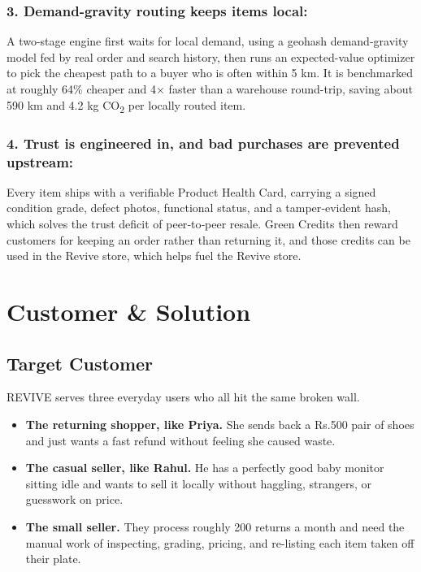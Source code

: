 \documentclass[11pt]{article}
\newcommand{\placeholder}[1]{{\color{placeGray} #1}}
\begin{document}
\subsubsection*{\color{amznSlate} 3. Demand-gravity routing keeps items local:}
\placeholder{A two-stage engine first waits for local demand, using a geohash demand-gravity model fed by real order and search history, then runs an expected-value optimizer to pick the cheapest path to a buyer who is often within 5 km. It is benchmarked at roughly 64\% cheaper and 4$\times$ faster than a warehouse round-trip, saving about 590 km and 4.2 kg CO\textsubscript{2} per locally routed item.}

\subsubsection*{\color{amznSlate} 4. Trust is engineered in, and bad purchases are prevented upstream:}
\placeholder{Every item ships with a verifiable Product Health Card, carrying a signed condition grade, defect photos, functional status, and a tamper‑evident hash, which solves the trust deficit of peer‑to‑peer resale. Green Credits then reward customers for keeping an order rather than returning it, and those credits can be used in the Revive store, which helps fuel the Revive store.}

\section{Customer \& Solution}

\subsection{Target Customer}

\placeholder{REVIVE serves three everyday users who all hit the same broken wall.}

\begin{itemize}[leftmargin=2em,itemsep=6pt,topsep=4pt]
  \item \textbf{The returning shopper, like Priya.} \placeholder{She sends back a Rs.500 pair of shoes and just wants a fast refund without feeling she caused waste.}
  \item \textbf{The casual seller, like Rahul.} \placeholder{He has a perfectly good baby monitor sitting idle and wants to sell it locally without haggling, strangers, or guesswork on price.}
  \item \textbf{The small seller.} \placeholder{They process roughly 200 returns a month and need the manual work of inspecting, grading, pricing, and re-listing each item taken off their plate.}
\end{itemize}
\end{document}
